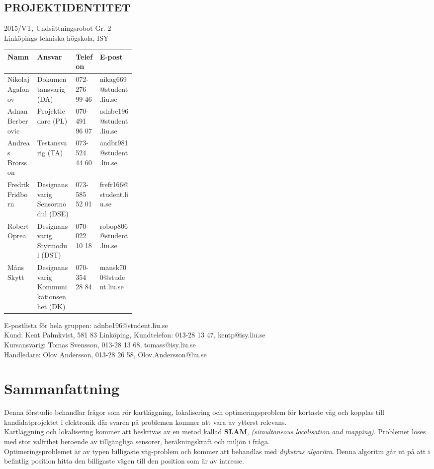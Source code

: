 \documentclass[11pt]{article}
\begin{document}
	\pagebreak
	\begin{center}
		
		\section*{PROJEKTIDENTITET}
		2015/VT, Undsättningsrobot Gr. 2
		\\
		Linköpings tekniska högskola, ISY
		\\[0.5in]
		\begin{table}[h]
			\begin{tabular}{|l|p{0.3\linewidth}|l|l|} \hline
				Namn & Ansvar & Telefon & E-post \\[0.1in] \hline
				Nikolaj Agafonov & Dokumentansvarig (DA) & 072-276 99 46 & nikag669@student.liu.se \\ \hline
				Adnan Berberovic & Projektledare (PL) & 070-491 96 07 & adnbe196@student.liu.se \\ \hline
				Andreas Brorsson & Testansvarig (TA) & 073-524 44 60 & andbr981@student.liu.se \\ \hline
				Fredrik Fridborn & Designansvarig Sensormodul (DSE) & 073-585 52 01 & frefr166@student.liu.se \\ \hline
				Robert Oprea & Designansvarig Styrmodul (DST) & 070-022 10 18 & robop806@student.liu.se \\ \hline
				Måns Skytt & Designansvarig Kommunikationsenhet (DK) & 070-354 28 84 & mansk700@student.liu.se \\ \hline
			\end{tabular}
		\end{table}
		
		E-postlista för hela gruppen: adnbe196@student.liu.se
		\\[1in]
		Kund: Kent Palmkvist, 581 83 Linköping,
		Kundtelefon: 013-28 13 47, kentp@isy.liu.se
		\\[1in]
		Kursansvarig: Tomas Svensson, 013-28 13 68, tomass@isy.liu.se
		\\
		Handledare: Olov Andersson, 013-28 26 58, Olov.Andersson@liu.se
	\end{center}
	\pagebreak
	\setcounter{secnumdepth}{0} %
	\section*{Sammanfattning}
	Denna förstudie behandlar frågor som rör kartläggning, lokalisering och optimeringsproblem för kortaste väg och kopplas till kandidatprojektet i elektronik där svaren på problemen kommer att vara av ytterst relevans.\\[0.1in]
	Kartläggning och lokalisering kommer att beskrivas av en metod kallad \textbf{SLAM}, \textit{(simultaneous localisation and mapping)}. Problemet löses med stor valfrihet beroende av tillgängliga sensorer, beräkningskraft och miljön i fråga.\\[0.1in]
	Optimeringsproblemet är av typen billigaste väg-problem och kommer att behandlas med \textit{dijkstras algoritm}. Denna algoritm går ut på att i befintlig position hitta den billigaste vägen till den position som är av intresse.
	
\end{document}
